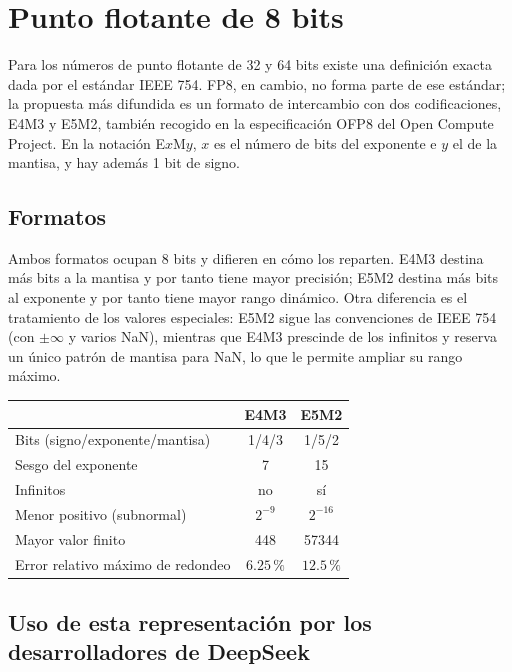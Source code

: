 \documentclass{article}
\begin{document}
  \section{Punto flotante de 8 bits}

    Para los números de punto flotante de 32 y 64 bits existe una
    definición exacta dada por el estándar IEEE 754. FP8, en cambio, no
    forma parte de ese estándar; la propuesta más difundida es un formato
    de intercambio con dos codificaciones, E4M3 y E5M2, 
    también recogido en la especificación OFP8
    del Open Compute Project. En la notación E$x$M$y$,
    $x$ es el número de bits del exponente e $y$ el de la mantisa, y hay
    además 1 bit de signo.

    \subsection{Formatos}

      Ambos formatos ocupan 8 bits y difieren en cómo los reparten. E4M3
      destina más bits a la mantisa y por tanto tiene mayor precisión; E5M2
      destina más bits al exponente y por tanto tiene mayor rango dinámico.
      Otra diferencia es el tratamiento de los valores especiales: E5M2
      sigue las convenciones de IEEE 754 (con $\pm\infty$ y varios NaN),
      mientras que E4M3 prescinde de los infinitos y reserva un único patrón
      de mantisa para NaN, lo que le permite ampliar su rango máximo.

      \begin{center}
        \begin{tabular}{lcc}
          \toprule
          & E4M3 & E5M2 \\
          \midrule
          Bits (signo/exponente/mantisa) & 1/4/3 & 1/5/2 \\
          Sesgo del exponente & 7 & 15 \\
          Infinitos & no & sí \\
          Menor positivo (subnormal) & $2^{-9}$ & $2^{-16}$ \\
          Mayor valor finito & 448 & 57344 \\
          Error relativo máximo de redondeo & $6.25\,\%$ & $12.5\,\%$ \\
          \bottomrule
        \end{tabular}
      \end{center}

    \subsection{Uso de esta representación por los desarrolladores de DeepSeek}
\end{document}
